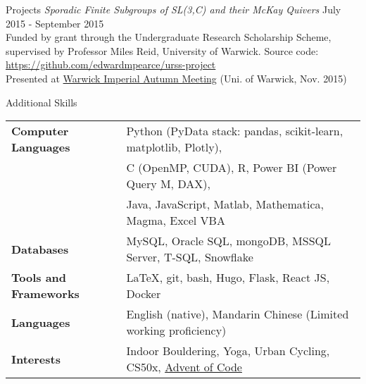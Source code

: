 \documentclass{resume} %
\begin{document}
\begin{rSection}{Projects}
{\em Sporadic Finite Subgroups of SL(3,C) and their McKay Quivers} \hfill July 2015 - September 2015 \\
Funded by grant through the Undergraduate Research Scholarship Scheme, supervised by Professor Miles Reid, University of Warwick.
Source code: \href{https://github.com/edwardmpearce/urss-project}{https://github.com/edwardmpearce/urss-project} \\
Presented at \href{https://warwick.ac.uk/fac/sci/maths/research/events/2015-16/nonsymposium/wimp/}{Warwick Imperial Autumn Meeting} (Uni. of Warwick, Nov. 2015)

\end{rSection}


\begin{rSection}{Additional Skills}

	\begin{tabular}{ @{} >{\bfseries}l @{\hspace{6ex}} l }
		Computer Languages & Python (PyData stack: pandas, scikit-learn, matplotlib, Plotly), \\
		& C (OpenMP, CUDA), R, Power BI (Power Query M, DAX), \\
		& Java, JavaScript, Matlab, Mathematica, Magma, Excel VBA \\
		Databases & MySQL, Oracle SQL, mongoDB, MSSQL Server, T-SQL, Snowflake \\
		Tools and Frameworks & LaTeX, git, bash, Hugo, Flask, React JS, Docker \\
		Languages & English (native), Mandarin Chinese (Limited working proficiency) \smallskip \\
		Interests & Indoor Bouldering, Yoga, Urban Cycling, CS50x, \href{https://github.com/edwardmpearce/adventofcode}{Advent of Code}
	\end{tabular}

\end{rSection}





\end{document}
